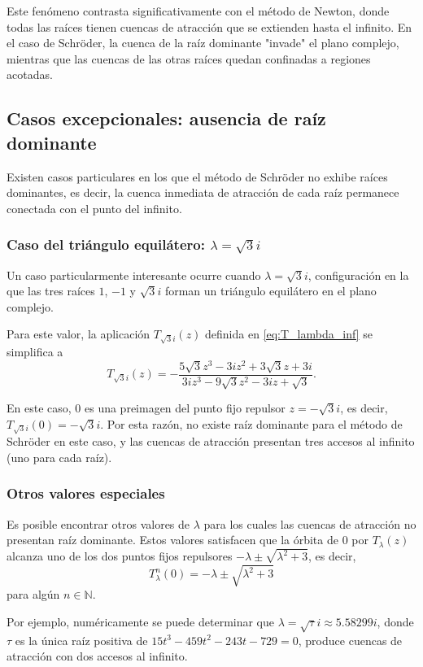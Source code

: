 Este fenómeno contrasta significativamente con el método de Newton, donde todas las raíces tienen cuencas de atracción que se extienden hasta el infinito. En el caso de Schröder, la cuenca de la raíz dominante "invade" el plano complejo, mientras que las cuencas de las otras raíces quedan confinadas a regiones acotadas.

\subsection{Casos excepcionales: ausencia de raíz dominante}

Existen casos particulares en los que el método de Schröder no exhibe raíces dominantes, es decir, la cuenca inmediata de atracción de cada raíz permanece conectada con el punto del infinito.

\subsubsection{Caso del triángulo equilátero: $\lambda=\sqrt{3}i$}

Un caso particularmente interesante ocurre cuando $\lambda=\sqrt{3}i$, configuración en la que las tres raíces $1$, $-1$ y $\sqrt{3}i$ forman un triángulo equilátero en el plano complejo.

Para este valor, la aplicación $T_{\sqrt{3}i}(z)$ definida en \eqref{eq:T_lambda_inf} se simplifica a
$$
T_{\sqrt{3}i}(z)=-\frac{5\sqrt{3}z^3-3iz^2+3\sqrt{3}z+3i}{3iz^3-9\sqrt{3}z^2-3iz+\sqrt{3}}.
$$

En este caso, $0$ es una preimagen del punto fijo repulsor $z=-\sqrt{3}i$, es decir, $T_{\sqrt{3}i}(0)=-\sqrt{3}i$. Por esta razón, no existe raíz dominante para el método de Schröder en este caso, y las cuencas de atracción presentan tres accesos al infinito (uno para cada raíz).

\subsubsection{Otros valores especiales}

Es posible encontrar otros valores de $\lambda$ para los cuales las cuencas de atracción no presentan raíz dominante. Estos valores satisfacen que la órbita de $0$ por $T_\lambda(z)$ alcanza uno de los dos puntos fijos repulsores $-\lambda\pm\sqrt{\lambda^2+3}$, es decir,
$$
T^n_\lambda(0)=-\lambda\pm\sqrt{\lambda^2+3}
$$
para algún $n\in\mathbb{N}$.

Por ejemplo, numéricamente se puede determinar que $\lambda=\sqrt{\tau}i\approx 5.58299i$, donde $\tau$ es la única raíz positiva de $15t^3-459t^2-243t-729=0$, produce cuencas de atracción con dos accesos al infinito.

